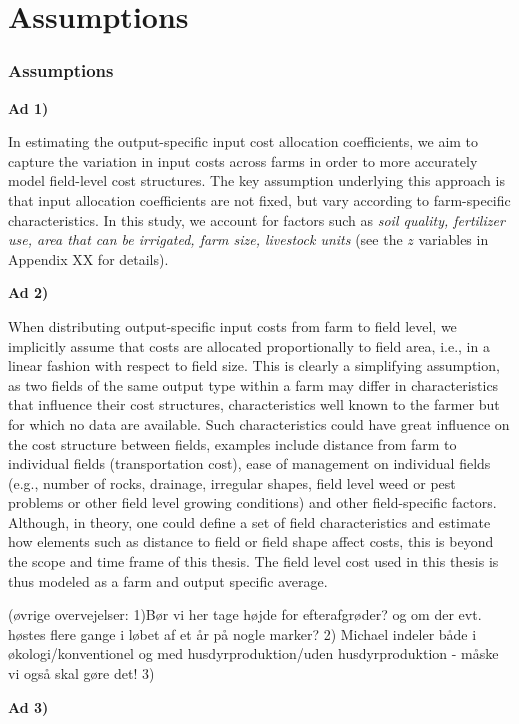 \documentclass[12pt]{article}
\begin{document}
\section{Assumptions}
\subsubsection{Assumptions} 
\label{sec:model_assumptions}

\textbf{Ad 1)}  


In estimating the output-specific input cost allocation coefficients, we aim to capture the variation in input costs across farms in order to more accurately model field-level cost structures. 
The key assumption underlying this approach is that input allocation coefficients are not fixed, but vary according to farm-specific characteristics. 
In this study, we account for factors such as \textit{soil quality, fertilizer use, area that can be irrigated, farm size, livestock units} (see the $z$ variables in Appendix XX for details). 


\textbf{Ad 2)}   

When distributing output-specific input costs from farm to field level, we implicitly assume that costs are allocated proportionally to field area, i.e., in a linear fashion with respect to field size. This is clearly a simplifying assumption, as two fields of the same output type within a farm may differ in characteristics that influence their cost structures, characteristics well known to the farmer but for which no data are available. Such characteristics could have great influence on the cost structure between fields, examples include distance from farm to individual fields (transportation cost), ease of management on individual fields (e.g., number of rocks,  drainage, irregular shapes, field level weed or pest problems or other field level growing conditions) and other field-specific factors. Although, in theory, one could define a set of field characteristics and estimate how elements such as distance to field or field shape affect costs, this is beyond the scope and time frame of this thesis. The field level cost used in this thesis is thus modeled as a farm and output specific average.

(øvrige overvejelser: 1)Bør vi her tage højde for efterafgrøder? og om der evt. høstes flere gange i løbet af et år på nogle marker? 2) Michael indeler både i økologi/konventionel og med husdyrproduktion/uden husdyrproduktion - måske vi også skal gøre det! 3)

\textbf{Ad 3)}
\end{document}
